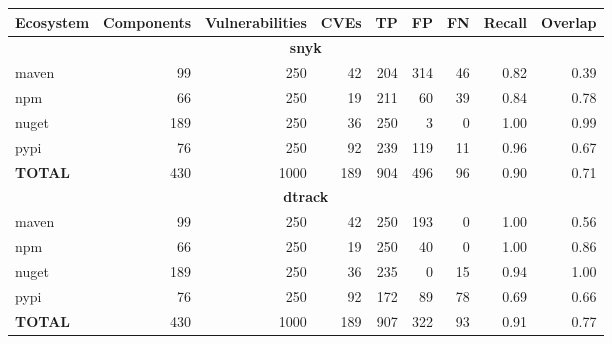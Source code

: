 \begin{table}[!t]
\centering
\small
\begin{tabular}{lrrrrrrrr}
\toprule
Ecosystem & Components & Vulnerabilities & CVEs & TP & FP & FN & Recall & Overlap \\
\midrule
\multicolumn{9}{c}{\textbf{snyk}} \\
\midrule
maven & 99 & 250 & 42 & 204 & 314 & 46 & 0.82 & 0.39 \\
npm & 66 & 250 & 19 & 211 & 60 & 39 & 0.84 & 0.78 \\
nuget & 189 & 250 & 36 & 250 & 3 & 0 & 1.00 & 0.99 \\
pypi & 76 & 250 & 92 & 239 & 119 & 11 & 0.96 & 0.67 \\
\midrule
\textbf{TOTAL} & 430 & 1000 & 189 & 904 & 496 & 96 & 0.90 & 0.71 \\
\midrule
\multicolumn{9}{c}{\textbf{dtrack}} \\
\midrule
maven & 99 & 250 & 42 & 250 & 193 & 0 & 1.00 & 0.56 \\
npm & 66 & 250 & 19 & 250 & 40 & 0 & 1.00 & 0.86 \\
nuget & 189 & 250 & 36 & 235 & 0 & 15 & 0.94 & 1.00 \\
pypi & 76 & 250 & 92 & 172 & 89 & 78 & 0.69 & 0.66 \\
\midrule
\textbf{TOTAL} & 430 & 1000 & 189 & 907 & 322 & 93 & 0.91 & 0.77 \\
\midrule
\bottomrule
\end{tabular}
\end{table}
